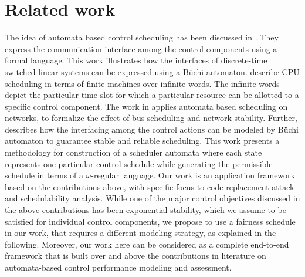 \section{Related work}
\noindent
The idea of automata based control scheduling has been discussed in \cite{WeissA07}. They express
the communication interface among the control components using a formal language. This work illustrates how the interfaces of discrete-time switched linear systems
can be expressed using a B\"{u}chi automaton. \cite{AlurW08}  describe CPU scheduling
in terms of finite machines over infinite words. The infinite words depict the particular time 
slot for which a particular resource can be allotted to a specific control component. The work in \cite{WeissFAA09} applies automata based scheduling on networks, to formalize the effect of bus scheduling and network stability. Further, \cite{GhoshMDHD16} describes how the interfacing among 
the control actions can be modeled by B\"{u}chi automaton to guarantee stable and reliable
scheduling. This work presents a methodology for construction of a scheduler automata 
where each state represents one particular control schedule while generating the permissible 
schedule in terms of a $\omega$-regular language. Our work is an application framework based on the contributions above, with specific focus to code replacement attack and schedulability analysis. While one of the major control objectives discussed in the above contributions has been exponential stability, which we assume to be satisfied for individual control components, we propose to use a fairness schedule in our work, that requires a different modeling strategy, as explained in the following. Moreover, our work here can be considered as a complete end-to-end framework that is built over and above the contributions in literature on automata-based control performance modeling and assessment.

